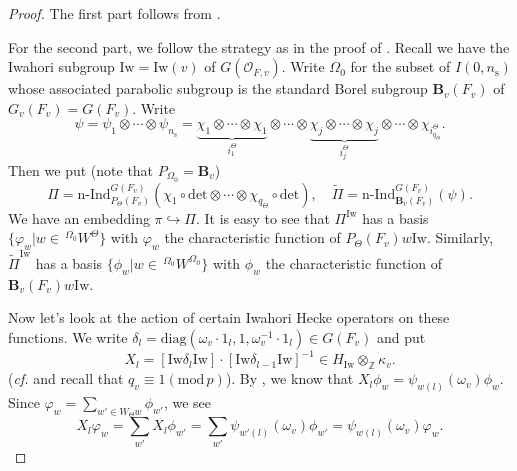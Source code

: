 \documentclass[12pt,oneside,reqno]{amsart}
\theoremstyle{plain}
\begin{document}
	\begin{proof}
		The first part follows from
		\cite[VI.1]{Vigneras1998}. 	
		
		
		
		For the second part,
		we follow the strategy as in the proof of
		\cite[Lemma 5.10]{Thorne2012}.
		Recall we have the Iwahori subgroup
		$\mathrm{Iw}=\mathrm{Iw}(v)$
		of $ G(\mathcal{O}_{F,v})$.
		Write $\Omega_0$
		for the subset of
		$I(0,n_\mathrm{s})$
		whose associated parabolic subgroup is
		the standard Borel subgroup
		$\mathbf{B}_v(F_v)$
		of $ G_v(F_v)= G(F_v)$.	
		Write
		\[
		\psi
		=
		\psi_1\otimes\cdots\otimes\psi_{n_\mathrm{s}}
		=
		\underbrace{\chi_1\otimes\cdots\otimes\chi_1}_{i_1^\Theta}
		\otimes
		\cdots
		\otimes
		\underbrace{\chi_j\otimes\cdots\otimes\chi_j}_{i_j^\Theta}
		\otimes
		\cdots
		\otimes
		\chi_{i_{q_\Theta}^\Theta}.
		\]	
		Then we put
		(note that $P_{\Omega_0}=\mathbf{B}_v$)
		\[
		\Pi=
		\mathrm{n}\text{-}\mathrm{Ind}_{P_\Theta(F_v)}^{ G(F_v)}
		\left(
		\chi_1\circ\mathrm{det}\otimes
		\cdots
		\otimes
		\chi_{q_\Theta}\circ\mathrm{det}
		\right),
		\quad
		\widetilde{\Pi}
		=
		\mathrm{n}\text{-}\mathrm{Ind}_{\mathbf{B}_v(F_v)}^{ G(F_v)}
		(\psi).
		\]
		We have an embedding $\pi\hookrightarrow\Pi$. It is easy to see that
		$\Pi^\mathrm{Iw}$ has a basis $\{\varphi_w|w\in\,^{\Omega_0}W^\Theta\}$
		with $\varphi_w$ the characteristic function of $P_\Theta(F_v)w\mathrm{Iw}$. Similarly, $\widetilde{\Pi}^\mathrm{Iw}$
		has a basis $\{\phi_w|w\in\,^{\Omega_0}W^{\Omega_0}\}$ with $\phi_w$ the characteristic function of $\mathbf{B}_v(F_v)w\mathrm{Iw}$.
		
		
		
		
		
		Now let's look at the action of certain Iwahori Hecke operators on these functions.
		We write $\delta_l=\mathrm{diag}(\omega_v\cdot1_l,1,\omega_v^{-1}\cdot1_l)
		\in	G(F_v)$ and put	
		\[
		X_l
		=
		[\mathrm{Iw}\delta_l\mathrm{Iw}]
		\cdot
		[\mathrm{Iw}\delta_{l-1}\mathrm{Iw}]^{-1}
		\in
		H_\mathrm{Iw}\otimes_\mathbb{Z}\kappa_v.
		\]
		(\emph{cf.}
		\cite[II.7]{Vigneras1998} and recall that
		$q_v\equiv1(\mathrm{mod}\,p)$).
		By
		\cite[Corollary 3.2]{Lansky2002},
		we know that
		$X_l\phi_w
		=
		\psi_{w(l)}(\omega_v)\phi_w$.
		Since
		$\varphi_w=\sum_{w'\in W_\Theta w}\phi_{w'}$,
		we see
		\[
		X_l\varphi_w
		=
		\sum_{w'}X_l\phi_{w'}
		=
		\sum_{w'}\psi_{w'(l)}(\omega_v)
		\phi_{w'}
		=
		\psi_{w(l)}(\omega_v)
		\varphi_w.
		\]
		

\end{proof}
\end{document}
